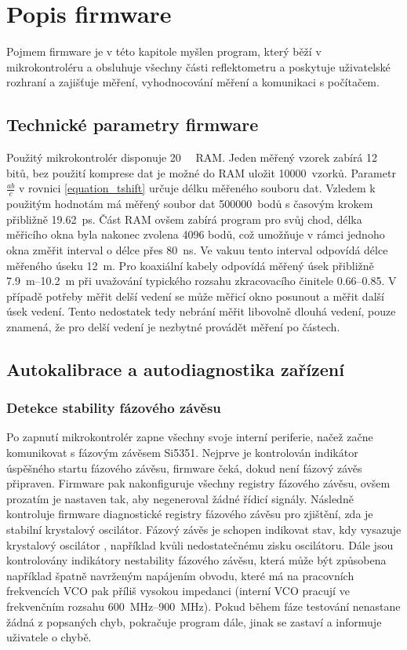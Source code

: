 \chapter{Popis firmware}

Pojmem firmware je v této kapitole myšlen program, který běží v mikrokontroléru a obsluhuje všechny části reflektometru a poskytuje uživatelské rozhraní a zajišťuje měření, vyhodnocování měření a komunikaci s počítačem.

\section{Technické parametry firmware}
Použitý mikrokontrolér disponuje \SI{20}{\kilo\byte} \acrshort{RAM}. Jeden měřený vzorek zabírá 12 bitů, bez použití komprese dat je možné do \acrshort{RAM} uložit 10000~vzorků. Parametr $\frac{a b}{c}$ v rovnici \ref{equation_tshift} určuje délku měřeného souboru dat. Vzledem k použitým hodnotám má měřený soubor dat 500000~bodů s časovým krokem přibližně \SI{19.62}{\pico\second}. Část RAM ovšem zabírá program pro svůj chod, délka měřicího okna byla nakonec zvolena 4096 bodů, což umožňuje v rámci jednoho okna změřit interval o délce přes \SI{80}{\nano\second}. Ve vakuu tento interval odpovídá délce měřeného úseku \SI{12}{\meter}. Pro koaxiální kabely odpovídá měřený úsek přibližně \SIrange{7.9}{10.2}{\meter} při uvažování typického rozsahu zkracovacího činitele \SIrange{0.66}{0.85}{}. V případě potřeby měřit delší vedení se může měřicí okno posunout a měřit další úsek vedení. Tento nedostatek tedy nebrání měřit libovolně dlouhá vedení, pouze znamená, že pro delší vedení je nezbytné provádět měření po částech.

\section{Autokalibrace a autodiagnostika zařízení}

\subsection{Detekce stability fázového závěsu}
Po zapnutí mikrokontrolér zapne všechny svoje interní periferie, načež začne komunikovat s fázovým závěsem Si5351. Nejprve je kontrolován indikátor úspěšného startu fázového závěsu, firmware čeká, dokud není fázový závěs připraven. Firmware pak nakonfiguruje všechny registry fázového závěsu, ovšem prozatím je nastaven tak, aby negeneroval žádné řídicí signály. Následně kontroluje firmware diagnostické registry fázového závěsu pro zjištění, zda je stabilní krystalový oscilátor. Fázový závěs je schopen indikovat stav, kdy vysazuje krystalový oscilátor \cite{Si5351datasheet}, například kvůli nedostatečnému zisku oscilátoru. Dále jsou kontrolovány indikátory nestability fázového závěsu, která může být způsobena například špatně navrženým napájením obvodu, které má na pracovních frekvencích \acrshort{VCO} pak příliš vysokou impedanci (interní \acrshort{VCO} pracují ve frekvenčním rozsahu \SIrange{600}{900}{\mega\hertz}). Pokud během fáze testování nenastane žádná z popsaných chyb, pokračuje program dále, jinak se zastaví a informuje uživatele o chybě.

